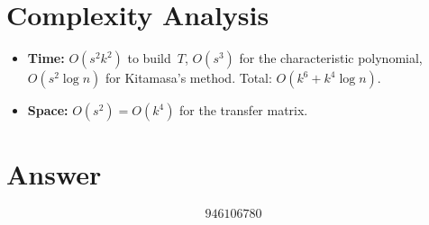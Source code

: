 \documentclass[11pt]{article}
\begin{document}
\section{Complexity Analysis}

\begin{itemize}
  \item \textbf{Time:} $O(s^2 k^2)$ to build~$T$, $O(s^3)$ for the characteristic polynomial, $O(s^2 \log n)$ for Kitamasa's method. Total: $O(k^6 + k^4 \log n)$.
  \item \textbf{Space:} $O(s^2) = O(k^4)$ for the transfer matrix.
\end{itemize}

\section{Answer}

\[
\boxed{946106780}
\]
\end{document}
